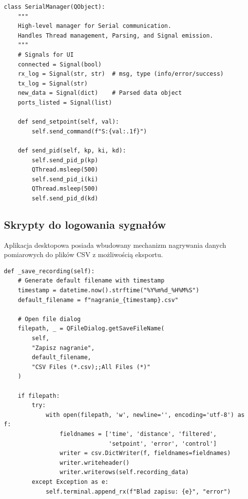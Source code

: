 \documentclass[11pt]{article}
\begin{document}
\begin{lstlisting}[caption={Manager komunikacji szeregowej (serial\_manager.py)}, style=pythonstyle]
class SerialManager(QObject):
    """
    High-level manager for Serial communication. 
    Handles Thread management, Parsing, and Signal emission.
    """
    # Signals for UI
    connected = Signal(bool)
    rx_log = Signal(str, str)  # msg, type (info/error/success)
    tx_log = Signal(str)
    new_data = Signal(dict)    # Parsed data object
    ports_listed = Signal(list)
    
    def send_setpoint(self, val):
        self.send_command(f"S:{val:.1f}")
        
    def send_pid(self, kp, ki, kd):
        self.send_pid_p(kp)
        QThread.msleep(500)
        self.send_pid_i(ki)
        QThread.msleep(500)
        self.send_pid_d(kd)
\end{lstlisting}

\subsection{Skrypty do logowania sygnałów}

Aplikacja desktopowa posiada wbudowany mechanizm nagrywania danych pomiarowych do plików CSV z możliwością eksportu.

\begin{lstlisting}[caption={Funkcja zapisu nagrania do CSV (app.py)}, style=pythonstyle]
def _save_recording(self):
    # Generate default filename with timestamp
    timestamp = datetime.now().strftime("%Y%m%d_%H%M%S")
    default_filename = f"nagranie_{timestamp}.csv"
    
    # Open file dialog
    filepath, _ = QFileDialog.getSaveFileName(
        self,
        "Zapisz nagranie",
        default_filename,
        "CSV Files (*.csv);;All Files (*)"
    )
    
    if filepath:
        try:
            with open(filepath, 'w', newline='', encoding='utf-8') as f:
                fieldnames = ['time', 'distance', 'filtered', 
                              'setpoint', 'error', 'control']
                writer = csv.DictWriter(f, fieldnames=fieldnames)
                writer.writeheader()
                writer.writerows(self.recording_data)
        except Exception as e:
            self.terminal.append_rx(f"Blad zapisu: {e}", "error")
\end{lstlisting}
\end{document}
